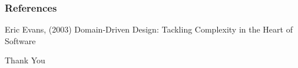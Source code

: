 \documentclass{beamer}
\begin{document}
	
\begin{frame}
\frametitle{References}
\footnotesize{
\begin{thebibliography}{99} %
	 Eric Evans, (2003)
	\newblock Domain-Driven Design: Tackling Complexity in the Heart of Software
\end{thebibliography}
}
\end{frame}


\begin{frame}
\Huge{\centerline{Thank You}}
\end{frame}

\end{document}
